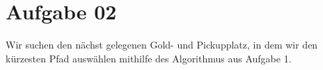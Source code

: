 \newpage
\section{Aufgabe 02}
Wir suchen den n\"achst gelegenen Gold- und Pickupplatz,
in dem wir den k\"urzesten Pfad ausw\"ahlen mithilfe des Algorithmus aus Aufgabe 1.
